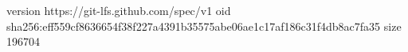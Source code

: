 version https://git-lfs.github.com/spec/v1
oid sha256:eff559cf8636654f38f227a4391b35575abe06ae1c17af186c31f4db8ac7fa35
size 196704
